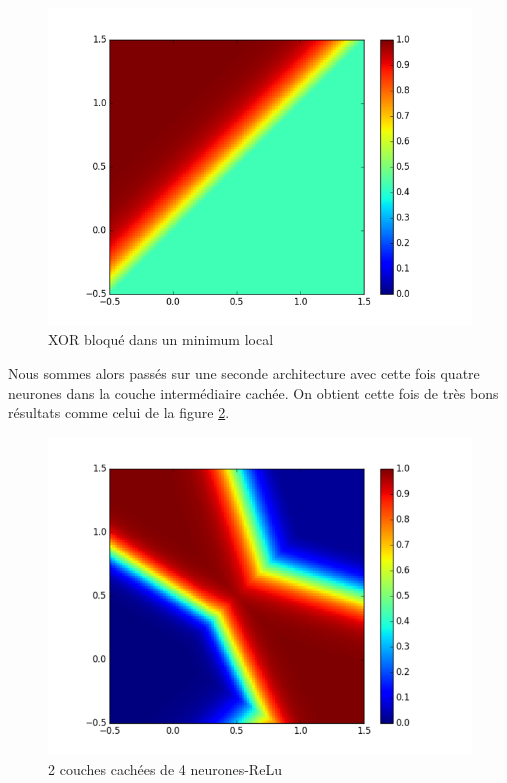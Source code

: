 \documentclass{report}
\theoremstyle{plain}
\theoremstyle{definition}
\theoremstyle{remark}
\begin{document}
\begin{figure}[!h]
\begin{center}
\includegraphics[scale=0.6]{images/xor_non_fonctionnel.png}
\caption{XOR bloqué dans un minimum local}
\label{xor_non_fonctionnel}
\end{center}
\end{figure}

Nous sommes alors passés sur une seconde architecture avec cette fois quatre neurones dans la couche intermédiaire cachée. On obtient cette fois de très bons résultats comme celui de la figure \ref{xor_relu_2_4}.

\begin{figure}[!h]
\begin{center}
\includegraphics[scale=0.6]{images/xor_relu_2_4.png}
\caption{2 couches cachées de 4 neurones-ReLu}
\label{xor_relu_2_4}
\end{center}
\end{figure}
\end{document}
